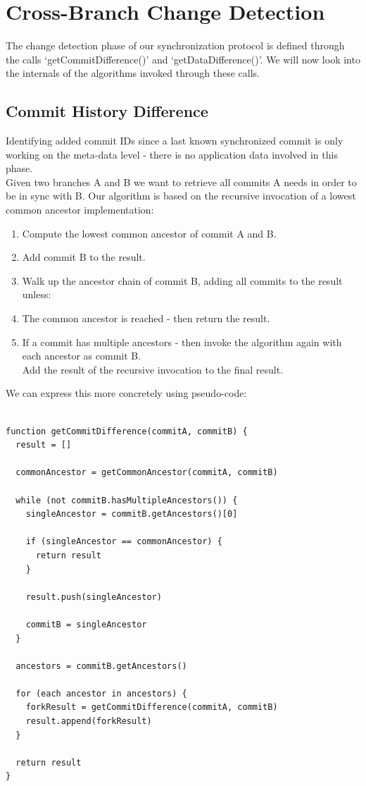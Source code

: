 
\section{Cross-Branch Change Detection}
\label{main.diff-across-commits}

The change detection phase of our synchronization protocol is defined through the calls `getCommitDifference()' and `getDataDifference()'.
We will now look into the internals of the algorithms invoked through these calls.\\

\subsection{Commit History Difference}
Identifying added commit IDs since a last known synchronized commit is only working on the meta-data level - there is no application data involved in this phase.\\
Given two branches A and B we want to retrieve all commits A needs in order to be in sync with B.
Our algorithm is based on the recursive invocation of a lowest common ancestor implementation:\\

\begin{enumerate}
\item Compute the lowest common ancestor of commit A and B.
\item Add commit B to the result.
\item Walk up the ancestor chain of commit B, adding all commits to the result unless:
\item The common ancestor is reached - then return the result.
\item If a commit has multiple ancestors - then invoke the algorithm again with each ancestor as commit B.\\
Add the result of the recursive invocation to the final result.
\end{enumerate}

We can express this more concretely using pseudo-code:\\

\begin{lstlisting}[caption=Detecting commit history difference, label=commit-difference]

function getCommitDifference(commitA, commitB) {
  result = []

  commonAncestor = getCommonAncestor(commitA, commitB)

  while (not commitB.hasMultipleAncestors()) {
    singleAncestor = commitB.getAncestors()[0]

    if (singleAncestor == commonAncestor) {
      return result
    }

    result.push(singleAncestor)

    commitB = singleAncestor
  }

  ancestors = commitB.getAncestors()

  for (each ancestor in ancestors) {
    forkResult = getCommitDifference(commitA, commitB)
    result.append(forkResult)
  }

  return result
}

\end{lstlisting}

